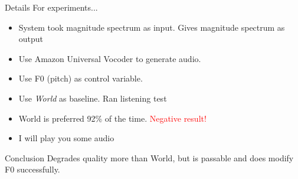\documentclass[10pt]{beamer}
\begin{document}
\begin{frame}{Details}
For experiments...
\begin{itemize}
    \item System took magnitude spectrum as input. Gives magnitude spectrum as output
    
    \item Use Amazon Universal Vocoder to generate audio.
    
    \item Use F0 (pitch) as control variable.
    
    \item Use \emph{World} as baseline. Ran listening test
    
    \item World is preferred 92\% of the time. \textcolor{red}{Negative result!}
    
    \item I will play you some audio
\end{itemize}

\begin{alertblock}{Conclusion}
Degrades quality more than World, but is passable and does modify F0 successfully.
\end{alertblock}
\end{frame}
\end{document}
